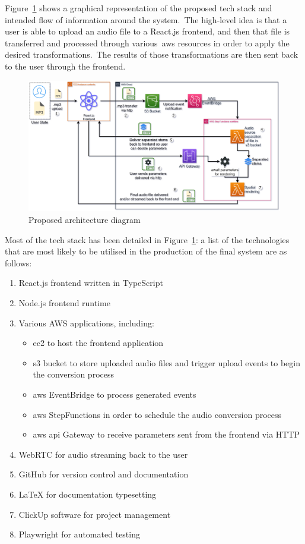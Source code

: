 \documentclass[a4paper, 12pt, british]{article}
\begin{document}
Figure~\ref{fig:proposed_architecture} shows a graphical representation of the proposed tech stack and intended flow of information around the system.\ The high-level idea is that a user is able to upload an audio file to a React.js frontend, and then that file is transferred and processed through various~\gls{aws} resources in order to apply the desired transformations.\ The results of those transformations are then sent back to the user through the frontend.

\begin{figure}[ht]
    \includegraphics[width=1\textwidth]{architecture_diagram}
    \caption{Proposed architecture diagram}
    \label{fig:proposed_architecture}
    \centering
\end{figure}

Most of the tech stack has been detailed in Figure~\ref{fig:proposed_architecture}: a list of the technologies that are most likely to be utilised in the production of the final system are as follows:

\begin{enumerate}
    \item React.js frontend written in TypeScript
    \item Node.js frontend runtime
    \item Various AWS applications, including:
    \begin{itemize}
        \item \gls{ec2} to host the frontend application
        \item \gls{s3} bucket to store uploaded audio files and trigger upload events to begin the conversion process
        \item \gls{aws} EventBridge to process generated events
        \item \gls{aws} StepFunctions in order to schedule the audio conversion process
        \item \gls{aws} \gls{api} Gateway to receive parameters sent from the frontend via HTTP
    \end{itemize}
    \item WebRTC for audio streaming back to the user
    \item GitHub for version control and documentation
    \item LaTeX for documentation typesetting
    \item ClickUp software for project management
    \item Playwright for automated testing
\end{enumerate}
\end{document}
